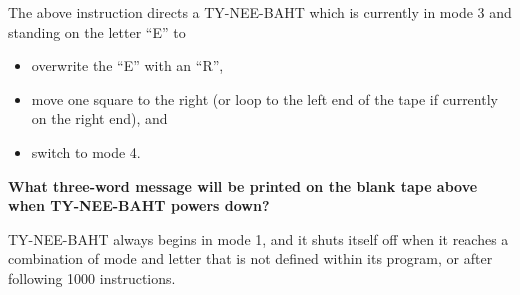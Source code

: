 \documentclass[12pt]{amsart}
\theoremstyle{definition}
\begin{document}
The above instruction directs a TY-NEE-BAHT which is currently
in mode 3 and standing on the letter ``E'' to
\begin{itemize}
\item overwrite the ``E'' with an ``R'',
\item move one square to the right (or loop to the left end of the tape
  if currently on the right end), and
\item switch to mode 4.
\end{itemize}

\textbf{What three-word message will be printed on the blank tape above
when TY-NEE-BAHT powers down?}



TY-NEE-BAHT always begins in mode 1, and
it shuts itself off when it reaches a combination of mode and letter that
is not defined within its program, or after following 1000 instructions.
\end{document}

